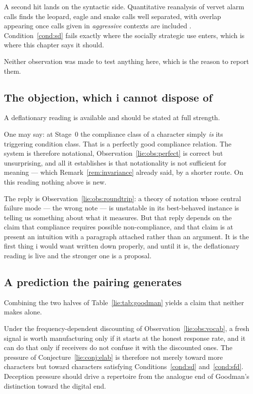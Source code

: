 A second hit lands on the syntactic side. Quantitative reanalysis of vervet
alarm calls finds the leopard, eagle and snake calls well separated, with
overlap appearing once calls given in \emph{aggressive} contexts are included
\cite{price2015}. Condition~\ref{cond:sd} fails exactly where the socially
strategic use enters, which is where this chapter says it should.

Neither observation was made to test anything here, which is the reason to
report them.

\subsection{The objection, which i cannot dispose of}
\label{sec:deflation}

A deflationary reading is available and should be stated at full strength.

One may say: at Stage~0 the compliance class of a character simply \emph{is} its
triggering condition class. That is a perfectly good compliance relation. The
system is therefore notational, Observation~\ref{lie:obs:perfect} is correct but
unsurprising, and all it establishes is that notationality is not sufficient for
meaning --- which Remark~\ref{rem:invariance} already said, by a shorter route.
On this reading nothing above is new.

The reply is Observation~\ref{lie:obs:roundtrip}: a theory of notation whose
central failure mode --- the wrong note --- is unstatable in its best-behaved
instance is telling us something about what it measures. But that reply depends
on the claim that compliance requires possible non-compliance, and that claim is
at present an intuition with a paragraph attached rather than an argument. It is
the first thing i would want written down properly, and until it is, the
deflationary reading is live and the stronger one is a proposal.

\subsection{A prediction the pairing generates}
\label{sec:digitality}

Combining the two halves of Table~\ref{lie:tab:goodman} yields a claim that
neither makes alone.

\begin{conjecture}
\label{lie:conj:digital}
Under the frequency-dependent discounting of
Observation~\ref{lie:obs:vocab}, a fresh signal is worth manufacturing only if
it starts at the honest response rate, and it can do that only if receivers do
not confuse it with the discounted ones. The pressure of
Conjecture~\ref{lie:conj:elab} is therefore not merely toward more characters
but toward characters satisfying Conditions~\ref{cond:sd}
and~\ref{cond:sfd}. Deception pressure should drive a repertoire from the
analogue end of Goodman's distinction toward the digital end.
\end{conjecture}

